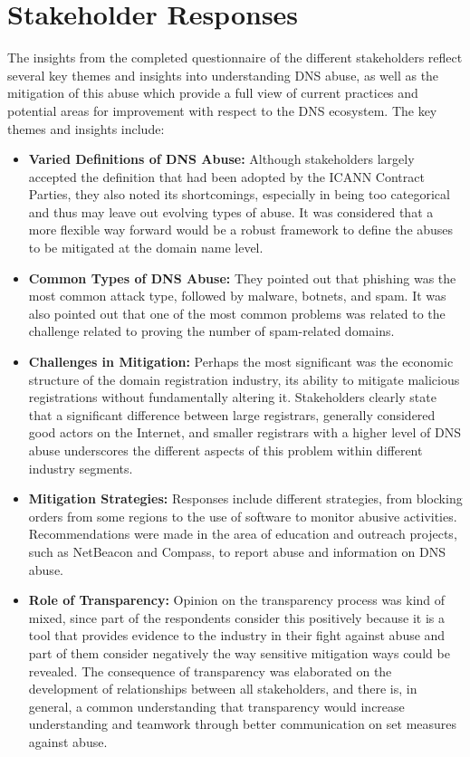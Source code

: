 \section{Stakeholder Responses} 

The insights from the completed questionnaire of the different stakeholders reflect several key themes and insights into understanding DNS abuse, as well as the mitigation of this abuse which provide a full view of current practices and potential areas for improvement with respect to the DNS ecosystem. The key themes and insights include:



\begin{itemize}
  \item \textbf{Varied Definitions of DNS Abuse:} Although stakeholders largely accepted the definition that had been adopted by the ICANN Contract Parties, they also noted its shortcomings, especially in being too categorical and thus may leave out evolving types of abuse. It was considered that a more flexible way forward would be a robust framework to define the abuses to be mitigated at the domain name level.
  
  \item \textbf{Common Types of DNS Abuse:} They pointed out that phishing was the most common attack type, followed by malware, botnets, and spam. It was also pointed out that one of the most common problems was related to the challenge related to proving the number of spam-related domains.
  
  \item \textbf{Challenges in Mitigation:} Perhaps the most significant was the economic structure of the domain registration industry, its ability to mitigate malicious registrations without fundamentally altering it. Stakeholders clearly state that a significant difference between large registrars, generally considered good actors on the Internet, and smaller registrars with a higher level of DNS abuse underscores the different aspects of this problem within different industry segments.
  
  \item \textbf{Mitigation Strategies:} Responses include different strategies, from blocking orders from some regions to the use of software to monitor abusive activities. Recommendations were made in the area of education and outreach projects, such as NetBeacon and Compass, to report abuse and information on DNS abuse.
  
  \item \textbf{Role of Transparency:} Opinion on the transparency process was kind of mixed, since part of the respondents consider this positively because it is a tool that provides evidence to the industry in their fight against abuse and part of them consider negatively the way sensitive mitigation ways could be revealed. The consequence of transparency was elaborated on the development of relationships between all stakeholders, and there is, in general, a common understanding that transparency would increase understanding and teamwork through better communication on set measures against abuse.
  
\end{itemize}

